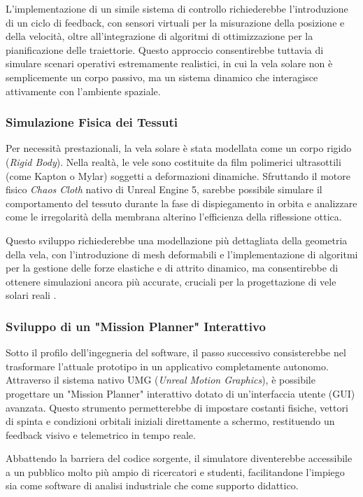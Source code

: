 L'implementazione di un simile sistema di controllo richiederebbe l'introduzione di un ciclo di feedback, con sensori virtuali per la misurazione della posizione e della velocità, oltre all'integrazione di algoritmi di ottimizzazione per la pianificazione delle traiettorie. Questo approccio consentirebbe tuttavia di simulare scenari operativi estremamente realistici, in cui la vela solare non è semplicemente un corpo passivo, ma un sistema dinamico che interagisce attivamente con l'ambiente spaziale.

\subsubsection{Simulazione Fisica dei Tessuti}
Per necessità prestazionali, la vela solare è stata modellata come un corpo rigido (\textit{Rigid Body}). Nella realtà, le vele sono costituite da film polimerici ultrasottili (come Kapton o Mylar) soggetti a deformazioni dinamiche. Sfruttando il motore fisico \textit{Chaos Cloth} nativo di Unreal Engine 5, sarebbe possibile simulare il comportamento del tessuto durante la fase di dispiegamento in orbita e analizzare come le irregolarità della membrana alterino l'efficienza della riflessione ottica. 

Questo sviluppo richiederebbe una modellazione più dettagliata della geometria della vela, con l'introduzione di mesh deformabili e l'implementazione di algoritmi per la gestione delle forze elastiche e di attrito dinamico, ma consentirebbe di ottenere simulazioni ancora più accurate, cruciali per la progettazione di vele solari reali \cite{johnson2012status, rodrigues2023review}.

\subsubsection{Sviluppo di un "Mission Planner" Interattivo}
Sotto il profilo dell'ingegneria del software, il passo successivo consisterebbe nel trasformare l'attuale prototipo in un applicativo completamente autonomo. Attraverso il sistema nativo UMG (\textit{Unreal Motion Graphics}), è possibile progettare un "Mission Planner" interattivo dotato di un'interfaccia utente (GUI) avanzata. Questo strumento permetterebbe di impostare costanti fisiche, vettori di spinta e condizioni orbitali iniziali direttamente a schermo, restituendo un feedback visivo e telemetrico in tempo reale. 

Abbattendo la barriera del codice sorgente, il simulatore diventerebbe accessibile a un pubblico molto più ampio di ricercatori e studenti, facilitandone l'impiego sia come software di analisi industriale che come supporto didattico.

